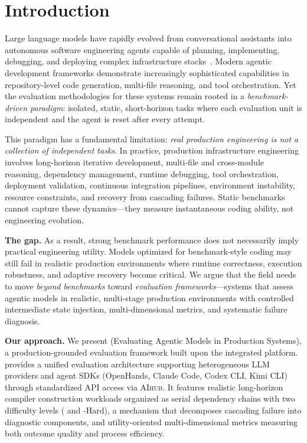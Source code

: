 \section{Introduction}

Large language models have rapidly evolved from conversational assistants into autonomous software engineering agents capable of planning, implementing, debugging, and deploying complex infrastructure stacks~\cite{jimenez2024swebench,liu2024agentbench,frontiereng2026}.
Modern agentic development frameworks demonstrate increasingly sophisticated capabilities in repository-level code generation, multi-file reasoning, and tool orchestration.
Yet the evaluation methodologies for these systems remain rooted in a \emph{benchmark-driven paradigm}: isolated, static, short-horizon tasks where each evaluation unit is independent and the agent is reset after every attempt.

This paradigm has a fundamental limitation: \emph{real production engineering is not a collection of independent tasks}.
In practice, production infrastructure engineering involves long-horizon iterative development, multi-file and cross-module reasoning, dependency management, runtime debugging, tool orchestration, deployment validation, continuous integration pipelines, environment instability, resource constraints, and recovery from cascading failures.
Static benchmarks cannot capture these dynamics---they measure instantaneous coding ability, not engineering evolution.

\textbf{The gap.}
As a result, strong benchmark performance does not necessarily imply practical engineering utility.
Models optimized for benchmark-style coding may still fail in realistic production environments where runtime correctness, execution robustness, and adaptive recovery become critical.
We argue that the field needs to move \emph{beyond benchmarks} toward \emph{evaluation frameworks}---systems that assess agentic models in realistic, multi-stage production environments with controlled intermediate state injection, multi-dimensional metrics, and systematic failure diagnosis.

\textbf{Our approach.}
We present \eva{} (Evaluating Agentic Models in Production Systems), a production-grounded evaluation framework built upon the \yatcc{} integrated platform.
\eva{} provides a unified evaluation architecture supporting heterogeneous LLM providers and agent SDKs (OpenHands, Claude Code, Codex CLI, Kimi CLI) through standardized API access via \textsc{AIhub}.
It features realistic long-horizon compiler construction workloads organized as serial dependency chains with two difficulty levels (\yatcc{} and \yatcc{}-Hard), a \resurrection{} mechanism that decomposes cascading failure into diagnostic components, and utility-oriented multi-dimensional metrics measuring both outcome quality and process efficiency.

